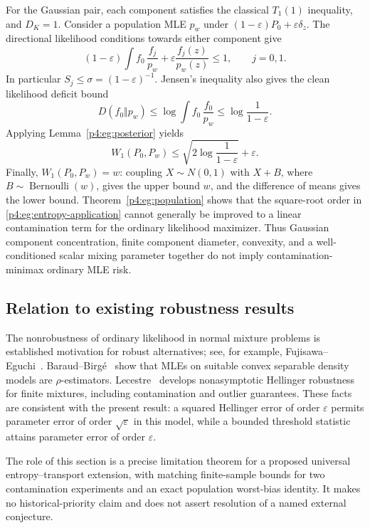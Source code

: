 \documentclass[11pt,a4paper]{article}
\theoremstyle{definition}
\theoremstyle{remark}
\numberwithin{equation}{section}
\begin{document}
For the Gaussian pair, each component satisfies the classical
$T_1(1)$ inequality, and $D_K=1$. Consider a population MLE
$p_w$ under $(1-\varepsilon)P_0+\varepsilon\delta_z$.
The directional likelihood conditions towards either component give
\[
 (1-\varepsilon)\int f_0\,\frac{f_j}{p_w}
       +\varepsilon\frac{f_j(z)}{p_w(z)}\le1,
 \qquad j=0,1.
\]
In particular $S_j\le\sigma=(1-\varepsilon)^{-1}$.
Jensen's inequality also gives the clean likelihood deficit bound
\[
 D(f_0\Vert p_w)
 \le\log\int f_0\,\frac{f_0}{p_w}
 \le\log\frac1{1-\varepsilon}.
\]
Applying Lemma~\ref{p4:eg:posterior} yields
\begin{equation}\label{p4:eg:entropy-application}
 W_1(P_0,P_w)
 \le\sqrt{2\log\frac1{1-\varepsilon}}+\varepsilon.
\end{equation}
Finally, $W_1(P_0,P_w)=w$: coupling $X\sim N(0,1)$ with
$X+B$, where $B\sim\operatorname{Bernoulli}(w)$, gives the
upper bound $w$, and the difference of means gives the lower bound.
Theorem~\ref{p4:eg:population} shows that the square-root order in
\eqref{p4:eg:entropy-application} cannot generally be improved to a
linear contamination term for the ordinary likelihood maximizer.
Thus Gaussian component concentration, finite component diameter,
convexity, and a well-conditioned scalar mixing parameter together
do not imply contamination-minimax ordinary MLE risk.

\subsection{Relation to existing robustness results}

The nonrobustness of ordinary likelihood in normal mixture problems
is established motivation for robust alternatives; see, for example,
Fujisawa--Eguchi~\cite{p4:eg:FujisawaEguchi}.
Baraud--Birg\'e~\cite[Section~6]{p4:eg:BaraudBirge} show that MLEs on
suitable convex separable density models are $\rho$-estimators.
Lecestre~\cite{p4:eg:Lecestre} develops nonasymptotic Hellinger robustness
for finite mixtures, including contamination and outlier guarantees.
These facts are consistent with the present result: a squared
Hellinger error of order $\varepsilon$ permits parameter error
of order $\sqrt\varepsilon$ in this model, while a bounded
threshold statistic attains parameter error of order $\varepsilon$.

The role of this section is a precise limitation theorem for a
proposed universal entropy--transport extension, with matching
finite-sample bounds for two contamination experiments and an exact
population worst-bias identity. It makes no historical-priority
claim and does not assert resolution of a named external conjecture.
\end{document}

